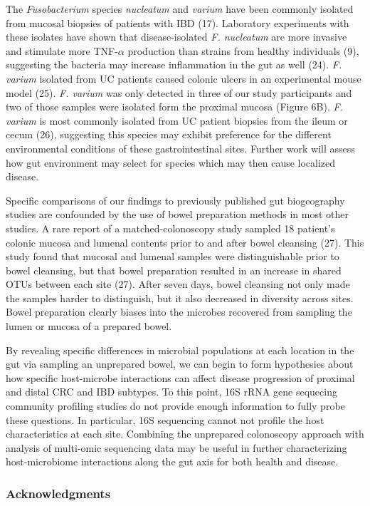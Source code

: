 \documentclass[11pt,]{article}
\begin{document}
The \emph{Fusobacterium} species \emph{nucleatum} and \emph{varium} have
been commonly isolated from mucosal biopsies of patients with IBD (17).
Laboratory experiments with these isolates have shown that
disease-isolated \emph{F. nucleatum} are more invasive and stimulate
more TNF-\(\alpha\) production than strains from healthy individuals
(9), suggesting the bacteria may increase inflammation in the gut as
well (24). \emph{F. varium} isolated from UC patients caused colonic
ulcers in an experimental mouse model (25). \emph{F. varium} was only
detected in three of our study participants and two of those samples
were isolated form the proximal mucosa (Figure 6B). \emph{F. varium} is
most commonly isolated from UC patient biopsies from the ileum or cecum
(26), suggesting this species may exhibit preference for the different
environmental conditions of these gastrointestinal sites. Further work
will assess how gut environment may select for species which may then
cause localized disease.

Specific comparisons of our findings to previously published gut
biogeography studies are confounded by the use of bowel preparation
methods in most other studies. A rare report of a matched-colonoscopy
study sampled 18 patient's colonic mucosa and lumenal contents prior to
and after bowel cleansing (27). This study found that mucosal and
lumenal samples were distinguishable prior to bowel cleansing, but that
bowel preparation resulted in an increase in shared OTUs between each
site (27). After seven days, bowel cleansing not only made the samples
harder to distinguish, but it also decreased in diversity across sites.
Bowel preparation clearly biases into the microbes recovered from
sampling the lumen or mucosa of a prepared bowel.

By revealing specific differences in microbial populations at each
location in the gut via sampling an unprepared bowel, we can begin to
form hypothesies about how specific host-microbe interactions can affect
disease progression of proximal and distal CRC and IBD subtypes. To this
point, 16S rRNA gene sequecing community profiling studies do not
provide enough information to fully probe these questions. In
particular, 16S sequencing cannot not profile the host characteristics
at each site. Combining the unprepared colonoscopy approach with
analysis of multi-omic sequencing data may be useful in further
characterizing host-microbiome interactions along the gut axis for both
health and disease.

\subsubsection{Acknowledgments}\label{acknowledgments}
\end{document}
